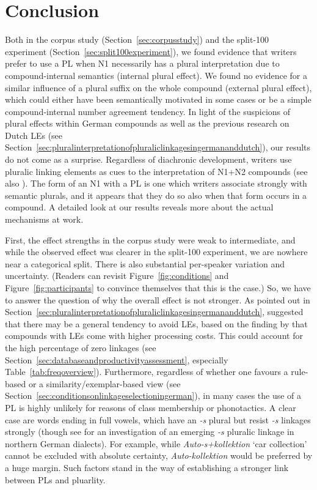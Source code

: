 \section{Conclusion}
\label{sec:conclusion}

Both in the corpus study (Section~\ref{sec:corpusstudy}) and the split-100 experiment (Section~\ref{sec:split100experiment}), we found evidence that writers prefer to use a PL when N1 necessarily has a plural interpretation due to compound-internal semantics (internal plural effect).
We found no evidence for a similar influence of a plural suffix on the whole compound (external plural effect), which could either have been semantically motivated in some cases or be a simple compound-internal number agreement tendency.
In light of the suspicions of plural effects within German compounds as well as the previous research on Dutch LEs (see Section~\ref{sec:pluralinterpretationofpluraliclinkagesingermananddutch}), our results do not come as a surprise.
Regardless of diachronic development, writers use pluralic linking elements as cues to the interpretation of N1+N2 compounds (see also \citealt[212]{BangaEa2013b}).
The form of an N1 with a PL is one which writers associate strongly with semantic plurals, and it appears that they do so also when that form occurs in a compound.
A detailed look at our results reveals more about the actual mechanisms at work.

First, the effect strengths in the corpus study were weak to intermediate, and while the observed effect was clearer in the split-100 experiment, we are nowhere near a categorical split.
There is also substantial per-speaker variation and uncertainty.
(Readers can revisit Figure~\ref{fig:conditions} and Figure~\ref{fig:participants} to convince themselves that this is the case.)
So, we have to answer the question of why the overall effect is not stronger.
As pointed out in Section~\ref{sec:pluralinterpretationofpluraliclinkagesingermananddutch}, \textcite[45]{BangaEa2013a} suggested that there may be a general tendency to avoid LEs, based on the finding by \textcite{LibbenEa2002} that compounds with LEs come with higher processing costs.
This could account for the high percentage of zero linkages (see Section~\ref{sec:databaseandproductivityassessment}, especially Table~\ref{tab:freqoverview}).
Furthermore, regardless of whether one favours a rule-based or a similarity\slash exemplar-based view (see Section~\ref{sec:conditionsonlinkageselectioningerman}), in many cases the use of a PL is highly unlikely for reasons of class membership or phonotactics.
A clear case are words ending in full vowels, which have an \textit{-s} plural but resist \textit{-s} linkages strongly (though see \textcite{Fehringer2009} for an investigation of an emerging \textit{-s} pluralic linkage in northern German dialects).
For example, while \textit{Auto-s+kollektion} `car collection' cannot be excluded with absolute certainty, \textit{Auto-kollektion} would be preferred by a huge margin.
Such factors stand in the way of establishing a stronger link between PLs and pluarlity.

